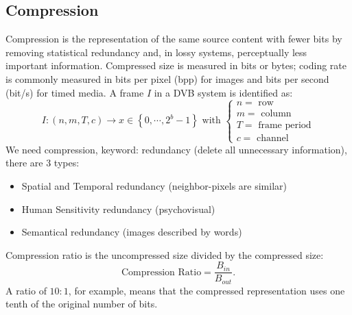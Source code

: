 \subsection{Compression}
Compression is the representation of the same source content with fewer bits by removing statistical redundancy and, in lossy systems, perceptually less important information. Compressed size is measured in bits or bytes; coding rate is commonly measured in bits per pixel (bpp) for images and bits per second (bit/s) for timed media.
A frame $I$ in a DVB system is identified as:
$$I : (n,m,T,c) \to x \in \left\{0, \cdots, 2^b - 1\right\} \text{ with }\begin{cases}
    n = \text{ row}\\
    m = \text{ column}\\
    T = \text{ frame period}\\
    c = \text{ channel}
\end{cases}$$
We need compression, keyword: redundancy (delete all unnecessary information), there are 3 types:
\begin{itemize}
    \item Spatial and Temporal redundancy (neighbor-pixels are similar)
    \item Human Sensitivity redundancy (psychovisual)
    \item Semantical redundancy (images described by words)
\end{itemize}
Compression ratio is the uncompressed size divided by the compressed size:
$$\text{Compression Ratio}=\frac{B_{in}}{B_{out}}.$$
A ratio of $10:1$, for example, means that the compressed representation uses one tenth of the original number of bits.
